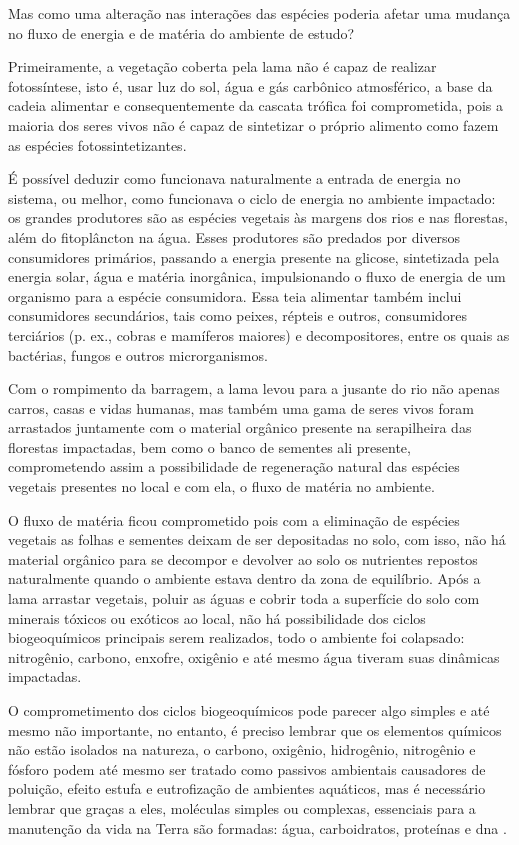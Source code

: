 \documentclass[
article,			%
11pt,				%
oneside,			%
a4paper,			%
english,			%
brazil,				%
sumario=tradicional
]{abntex2}
\begin{document}
	Mas como uma alteração nas interações das espécies poderia afetar uma mudança no fluxo de energia e de matéria do ambiente de estudo?
	
	Primeiramente, a vegetação coberta pela lama não é capaz de realizar fotossíntese, isto é, usar luz do sol, água e gás carbônico atmosférico, a base da cadeia alimentar e consequentemente da cascata trófica foi comprometida, pois a maioria dos seres vivos não é capaz de sintetizar o próprio alimento como fazem as espécies fotossintetizantes. 
	
	É possível deduzir como funcionava naturalmente a entrada de energia no sistema, ou melhor,  como funcionava o ciclo de energia no ambiente impactado: os grandes produtores são as espécies vegetais às margens dos rios e nas florestas, além do fitoplâncton na água. Esses produtores são predados por diversos consumidores primários, passando a energia presente na glicose, sintetizada pela energia solar, água e matéria inorgânica, impulsionando o fluxo de energia de um organismo para a espécie consumidora. Essa teia alimentar também inclui consumidores secundários, tais como peixes, répteis e outros, consumidores terciários (p. ex., cobras e mamíferos maiores) e decompositores, entre os quais as bactérias, fungos e outros microrganismos.
	
	Com o rompimento da barragem, a lama levou para a jusante do rio não apenas carros, casas e vidas humanas, mas também uma gama de seres vivos foram arrastados juntamente com o material orgânico presente na serapilheira das florestas impactadas, bem como o banco de sementes ali presente, comprometendo assim a possibilidade de regeneração natural das espécies vegetais presentes no local e com ela, o fluxo de matéria no ambiente. 
	
	O fluxo de matéria ficou comprometido pois com a eliminação de espécies vegetais as folhas e sementes deixam de ser depositadas no solo, com isso, não há material orgânico para se decompor e devolver ao solo os nutrientes repostos naturalmente quando o ambiente estava dentro da zona de equilíbrio. Após a lama arrastar vegetais, poluir as águas e cobrir toda a superfície do solo com minerais tóxicos ou exóticos ao local, não há possibilidade dos ciclos biogeoquímicos principais serem realizados, todo o ambiente foi colapsado: nitrogênio, carbono, enxofre, oxigênio e até mesmo água tiveram suas dinâmicas impactadas.
	
	O comprometimento dos ciclos biogeoquímicos pode parecer algo simples e até mesmo não importante, no entanto, é preciso lembrar que os elementos químicos não estão isolados na natureza, o carbono, oxigênio, hidrogênio, nitrogênio e fósforo podem até mesmo ser tratado como passivos ambientais causadores de poluição, efeito estufa e eutrofização de ambientes aquáticos, mas é necessário lembrar que graças a eles, moléculas simples ou complexas, essenciais para a manutenção da vida na Terra são formadas: água, carboidratos, proteínas e \gls{dna} \cite{ricklefs2016a}.
	
\end{document}
